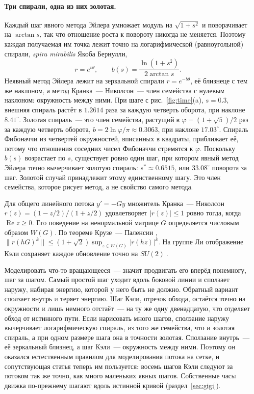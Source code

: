 \paragraph{Три спирали, одна из них золотая.} Каждый шаг явного метода Эйлера умножает
модуль на $\sqrt{1+s^2}$ и поворачивает на $\arctan s$, так что отношение роста к повороту никогда
не меняется. Поэтому каждая получаемая им точка лежит точно на логарифмической (равноугольной)
спирали, \emph{spira mirabilis} Якоба Бернулли,
\[
r=e^{b\theta},\qquad b(s)=\frac{\ln(1+s^2)}{2\arctan s}.
\]
Неявный метод Эйлера лежит на зеркальной спирали $r=e^{-b\theta}$, её близнеце с тем же наклоном, а
метод Кранка~--- Николсон~--- член семейства с нулевым наклоном: окружность между ними. При шаге с
рис.~\ref{fig:time}(a), $s=0.3$, внешняя спираль растёт в $1.2614$ раза за каждую четверть
оборота, при наклоне $8.41^\circ$. Золотая спираль~--- это член семейства, растущий в
$\varphi=(1+\sqrt5)/2$ раз за каждую четверть оборота, $b=2\ln\varphi/\pi\approx0.3063$, при наклоне
$17.03^\circ$. Спираль Фибоначчи из четвертей окружностей, вписанных в квадраты, приближает её, потому что
отношения соседних чисел Фибоначчи стремятся к $\varphi$. Поскольку $b(s)$ возрастает по $s$,
существует ровно один шаг, при котором явный метод Эйлера точно вычерчивает золотую спираль:
$s^\ast\approx0.6515$, или $33.08^\circ$ поворота за шаг. Золотой случай принадлежит этому единственному
шагу. Это член семейства, которое рисует метод, а не свойство самого метода.

Для общего линейного потока $y'=-Gy$ множитель Кранка~--- Николсон
$r(z)=(1-z/2)/(1+z/2)$ удовлетворяет $|r(z)|\le1$ ровно тогда, когда $\operatorname{Re}z\ge0$. Его
поведение на ненормальной матрице $G$ определяется числовым образом $W(G)$. По теореме
Крузе~--- Паленсии \cite{cp}, $\|r(hG)^k\|\le(1+\sqrt2)\sup_{z\in W(G)}|r(hz)|^k$. На группе
Ли отображение Кэли сохраняет каждое обновление точно на $SU(2)$ \cite{iserles}.

\begin{plain}
Моделировать что-то вращающееся~--- значит продвигать его вперёд понемногу, шаг за шагом. Самый простой
шаг уходит вдоль боковой линии и сползает наружу, набирая энергию, которой у него быть не должно.
Обратный вариант сползает внутрь и теряет энергию. Шаг Кэли, отрезок обхода, остаётся
точно на окружности и лишь немного отстаёт~--- на ту же одну двенадцатую, что отделяет
обход от истинного пути. Если нарисовать много шагов, сползание наружу вычерчивает логарифмическую
спираль, из того же семейства, что и золотая спираль, а при одном размере шага она в точности золотая.
Сползание внутрь~--- её зеркальный близнец, а шаг Кэли~--- окружность между ними. Поэтому
он оказался естественным правилом для моделирования потока на сетке, и сопутствующая статья теперь им
пользуется: восемь шагов Кэли следуют за потоком так же точно, как много маленьких явных шагов. Собственные
часы движка по-прежнему шагают вдоль истинной кривой (раздел~\ref{sec:gigi}).
\end{plain}

